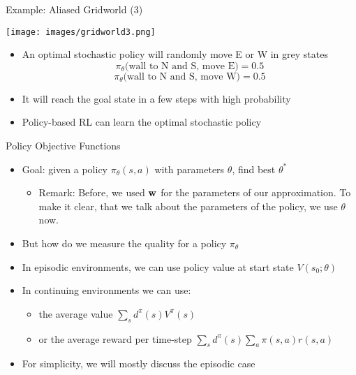 \documentclass[aspectratio=169]{../latex_main/tntbeamer}  %
\begin{document}
\begin{frame}[c]{Example: Aliased Gridworld (3)}
	
	\begin{center}
		\texttt{[image: images/gridworld3.png]}
	\end{center}
	
	\begin{itemize}
		\item An optimal \alert{stochastic} policy will randomly move E or W in grey states
		$$\pi_\theta\text{(wall to N and S, move E)} = 0.5 $$
		$$\pi_\theta\text{(wall to N and S, move W)} = 0.5 $$
		\item It will reach the goal state in a few steps with high probability
		\item Policy-based RL can learn the optimal stochastic policy
	\end{itemize}
	
\end{frame}
\begin{frame}[c]{Policy Objective Functions}
	
	\begin{itemize}
		\item Goal: given a policy $\pi_\theta(s,a)$ with parameters $\theta$, find best $\theta^*$
		\begin{itemize}
		    \item \alert{Remark}: Before, we used $\mathbf{w}$ for the parameters of our approximation. To make it clear, that we talk about the parameters of the policy, we use $\theta$ now.
		\end{itemize}
		\item But how do we measure the quality for a policy $\pi_\theta$
		\item In episodic environments, we can use policy value at start state $V(s_0; \theta)$
		\item In continuing environments we can use:
		\begin{itemize}
		    \item the average value $\sum_{s} d^{\pi}(s) V^{\pi}(s)$
		    \item or the average reward per time-step $\sum_{s} d^{\pi}(s) \sum_{a} \pi(s,a)r(s,a)$
		\end{itemize}
		\item For simplicity, we will mostly discuss the episodic case
	\end{itemize}
	
\end{frame}
\end{document}
